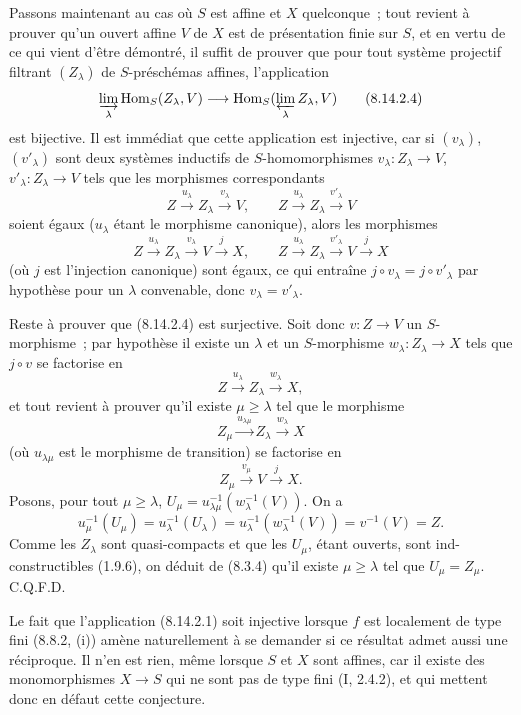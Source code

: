 Passons maintenant au cas où $S$ est affine et $X$ quelconque~; tout revient à
prouver qu'un ouvert affine $V$ de $X$ est de présentation finie sur $S$, et
en vertu de ce qui vient d'être démontré, il suffit de prouver que pour tout
système projectif filtrant $(Z_\lambda)$ de $S$-préschémas affines,
l'application
\begin{equation}
\label{IV.8.14.2.4-fr}
\varinjlim_\lambda\operatorname{Hom}_S(Z_\lambda,V)
\longrightarrow
\operatorname{Hom}_S(\varprojlim_\lambda Z_\lambda,V) \tag{8.14.2.4}
\end{equation}
est bijective. Il est immédiat que cette application est injective, car si
$(v_\lambda)$, $(v'_\lambda)$ sont deux systèmes inductifs de
$S$-homomorphismes $v_\lambda:Z_\lambda\to V$,
$v'_\lambda:Z_\lambda\to V$ tels que les morphismes correspondants
\[
Z\xrightarrow{u_\lambda}Z_\lambda\xrightarrow{v_\lambda}V,
\qquad
Z\xrightarrow{u_\lambda}Z_\lambda\xrightarrow{v'_\lambda}V
\]
soient égaux ($u_\lambda$ étant le morphisme canonique), alors les morphismes
\[
Z\xrightarrow{u_\lambda}Z_\lambda\xrightarrow{v_\lambda}V
\xrightarrow{j}X,
\qquad
Z\xrightarrow{u_\lambda}Z_\lambda\xrightarrow{v'_\lambda}V
\xrightarrow{j}X
\]
(où $j$ est l'injection canonique) sont égaux, ce qui entraîne
$j\circ v_\lambda=j\circ v'_\lambda$ par hypothèse pour un $\lambda$
convenable, donc $v_\lambda=v'_\lambda$.

Reste à prouver que (8.14.2.4) est surjective. Soit donc $v:Z\to V$ un
$S$-morphisme~; par hypothèse il existe un $\lambda$ et un $S$-morphisme
$w_\lambda:Z_\lambda\to X$ tels que $j\circ v$ se factorise en
\[
Z\xrightarrow{u_\lambda}Z_\lambda\xrightarrow{w_\lambda}X,
\]
et tout revient à prouver qu'il existe $\mu\geqslant\lambda$ tel que le
morphisme
\[
Z_\mu\xrightarrow{u_{\lambda\mu}}Z_\lambda
\xrightarrow{w_\lambda}X
\]
(où $u_{\lambda\mu}$ est le morphisme de transition) se factorise en
\[
Z_\mu\xrightarrow{v_\mu}V\xrightarrow{j}X.
\]
Posons, pour tout $\mu\geqslant\lambda$,
$U_\mu=u_{\lambda\mu}^{-1}(w_\lambda^{-1}(V))$. On a
\[
u_\mu^{-1}(U_\mu)=u_\lambda^{-1}(U_\lambda)
=u_\lambda^{-1}(w_\lambda^{-1}(V))=v^{-1}(V)=Z.
\]
Comme les $Z_\lambda$ sont quasi-compacts et que les $U_\mu$, étant ouverts,
sont ind-constructibles (1.9.6), on déduit de (8.3.4) qu'il existe
$\mu\geqslant\lambda$ tel que $U_\mu=Z_\mu$. C.Q.F.D.

\begin{remark}[8.14.3]
\label{IV.8.14.3-fr}
Le fait que l'application (8.14.2.1) soit injective lorsque $f$ est localement
de type fini (8.8.2, (i)) amène naturellement à se demander si ce résultat
admet aussi une réciproque. Il n'en est rien, même lorsque $S$ et $X$ sont
affines, car il existe des monomorphismes $X\to S$ qui ne sont pas de type fini
(I, 2.4.2), et qui mettent donc en défaut cette conjecture.
\end{remark}
